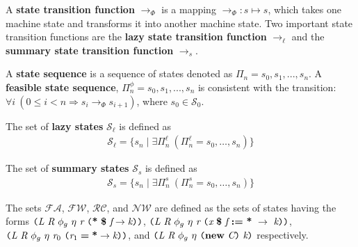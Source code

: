 \begin{definition}
A \textbf{state transition function} $\rightarrow_{\Phi}$ is a mapping $\rightarrow_{\Phi} : s \mapsto s$, which takes one machine state and transforms it into another machine state. Two important state transition functions are the \textbf{lazy state transition function} $\rightarrow_\ell$ and the \textbf{summary state transition function} $\rightarrow_s$.
\end{definition}

\begin{definition}
A \textbf{state sequence} is a sequence of states denoted as $\Pi_n = s_0,s_1,...,s_n$. A \textbf{feasible state sequence}, $\Pi_n^\phi = s_0,s_1,...,s_n$ is consistent with the transition: $\forall i\ (0 \leq i < n \Rightarrow s_i \rightarrow_{\Phi} s_{i+1})$, where $s_0\in \mathcal{S}_0$.
\end{definition}

\begin{comment}
\begin{definition}
A \textbf{feasible state sequence} is defined as a sequence of states resulting from repeated application of the state transition relation to some initial state $s_0\in \mathcal{S}_0$: $$\Pi_n = s_0,s_1,...,s_n$$ where the relation $s_i \rightarrow_{\Phi} s_{i+1}$ holds for all $i \in \{ i | 0 \leq i < n \}$
\end{definition}
\end{comment}

\begin{definition}
The set of \textbf{lazy states} $\mathcal{S}_\ell$ is defined as
\begin{align}
\mathcal{S}_\ell = \{s_n \mid \exists \Pi_n^\ell\ (\Pi_n^\ell = s_0, \ldots, s_n)\}
\end{align}
\end{definition}

\begin{definition}
The set of \textbf{summary states} $\mathcal{S}_s$ is defined as
\begin{align}
\mathcal{S}_s = \{s_n \mid \exists \Pi_n^s\ (\Pi_n^s = s_0, \ldots, s_n)\}
\end{align}
\end{definition}

\begin{definition}
The sets $\mathcal{FA}$, $\mathcal{FW}$, $\mathcal{RC}$, and  $\mathcal{NW}$ are defined as the sets of states having the forms $ \lp \cfgnt{L}\ \cfgnt{R}\ \phi_g\ \eta\ \cfgnt{r}\ \lp \cfgt{*}\ \cfgt{\$}\ \cfgnt{f} \rightarrow \cfgnt{k}\rp \rp$,  $\lp \cfgnt{L}\ \cfgnt{R}\ \phi_g\ \eta\ \cfgnt{r}\ \lp \cfgnt{x}\ \cfgt{\$}\ \cfgnt{f}\ \cfgt{:=}\ \cfgt{*}\ \rightarrow\ \cfgnt{k}\rp \rp$, $\texttt{(} \emph{L}\ \emph{R}\ \phi_g\ \eta\ \emph{r}_0\ \texttt{(} \emph{r}_1\; \textbf{=}\; \textbf{*} \rightarrow \emph{k}\texttt{)} \texttt{)}$, and $\texttt{(} \emph{L}\ \emph{R}\ \phi_g\ \eta\ \texttt{(} \textbf{new}\ \emph{C}\texttt{)} \ \emph{k}\texttt{)}$ respectively.
\end{definition}

